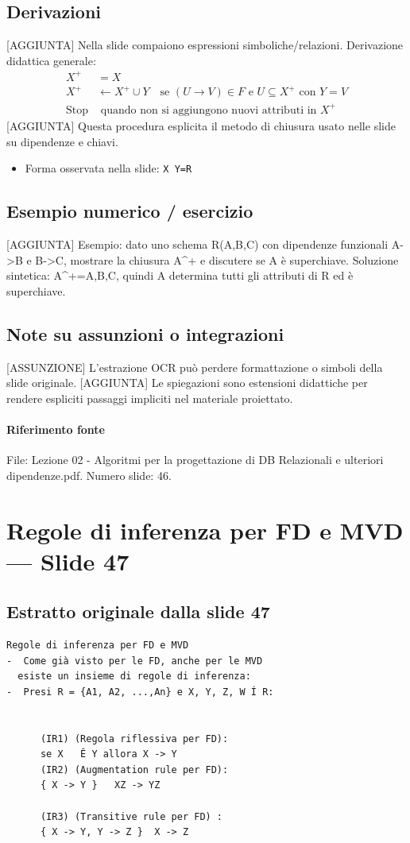 \documentclass[11pt]{article}
\begin{document}
\subsection*{Derivazioni}
[AGGIUNTA] Nella slide compaiono espressioni simboliche/relazioni. Derivazione didattica generale:
\begin{align*}
X^+ &= X \\
X^+ &\leftarrow X^+ \cup Y \quad \text{se } (U \to V) \in F \text{ e } U \subseteq X^+ \text{ con } Y=V \\
\text{Stop} &\text{ quando non si aggiungono nuovi attributi in } X^+
\end{align*}
[AGGIUNTA] Questa procedura esplicita il metodo di chiusura usato nelle slide su dipendenze e chiavi.
\begin{itemize}[leftmargin=*]
\item Forma osservata nella slide: \texttt{X  Y=R}
\end{itemize}
\subsection*{Esempio numerico / esercizio}
[AGGIUNTA] Esempio: dato uno schema R(A,B,C) con dipendenze funzionali A->B e B->C, mostrare la chiusura A^+ e discutere se A è superchiave. Soluzione sintetica: A^+={A,B,C}, quindi A determina tutti gli attributi di R ed è superchiave.
\subsection*{Note su assunzioni o integrazioni}
[ASSUNZIONE] L'estrazione OCR può perdere formattazione o simboli della slide originale.
[AGGIUNTA] Le spiegazioni sono estensioni didattiche per rendere espliciti passaggi impliciti nel materiale proiettato.
\paragraph{Riferimento fonte} File: Lezione 02 - Algoritmi per la progettazione di DB Relazionali e ulteriori dipendenze.pdf. Numero slide: 46.
\section{Regole di inferenza per FD e MVD --- Slide 47}
\subsection*{Estratto originale dalla slide 47}
\begin{lstlisting}
Regole di inferenza per FD e MVD
-  Come già visto per le FD, anche per le MVD
  esiste un insieme di regole di inferenza:
-  Presi R = {A1, A2, ...,An} e X, Y, Z, W Í R:


      (IR1) (Regola riflessiva per FD):
      se X   Ê Y allora X -> Y
      (IR2) (Augmentation rule per FD):
      { X -> Y }   XZ -> YZ

      (IR3) (Transitive rule per FD) :
      { X -> Y, Y -> Z }  X -> Z
\end{lstlisting}
\end{document}
